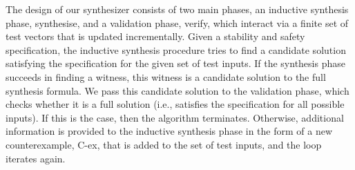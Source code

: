 \documentclass[10pt,conference]{IEEEtran}
\begin{document}


The design of our synthesizer consists of two main phases, an inductive
synthesis phase, {\sc synthesise}, and a validation phase, {\sc verify},
which interact via a finite set of test vectors that is updated
incrementally.  Given a stability and safety specification, the
inductive synthesis procedure tries to find a candidate solution
satisfying the specification for the given set of test inputs.
%
If the synthesis phase succeeds in finding a witness, this witness is
a candidate solution to the full synthesis formula.  We pass this
candidate solution to the validation phase, which checks whether it is
a full solution (i.e., satisfies the specification for all possible
inputs).  If this is the case, then the algorithm terminates.
Otherwise, additional information is provided to the inductive
synthesis phase in the form of a new counterexample, C-ex, that is added to
the set of test inputs, and the loop iterates again.
\end{document}
